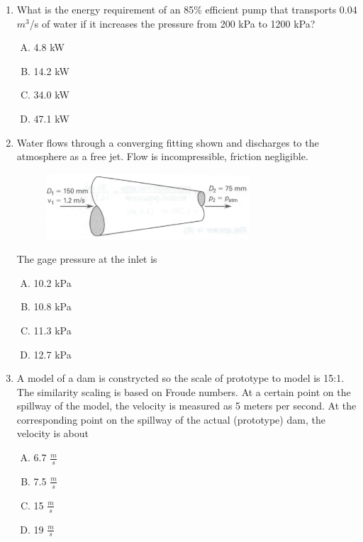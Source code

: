 \documentclass[12pt]{article}
\begin{document}
\begin{enumerate}
\item What is the energy requirement of an 85\% efficient pump that transports 0.04
$m^3$/s of water if it increases the pressure from 200 kPa to 1200 kPa?
\begin{enumerate}[A)]
\item 4.8 kW
\item 14.2 kW
\item 34.0 kW
\item 47.1 kW
\end{enumerate}

\item Water flows through a converging fitting shown and discharges to the atmosphere as a free jet.
Flow is incompressible, friction negligible.

\begin{figure}[htbp] %
   \centering
   \includegraphics[width=3in]{nozzle.png} 
   \caption{}
   \label{fig:nozzle}
\end{figure}

The gage pressure at the inlet is
\begin{enumerate}[A)]
\item 10.2 kPa
\item 10.8 kPa
\item 11.3 kPa
\item 12.7 kPa
\end{enumerate}

\item A model of a dam is constrycted so the scale of prototype to model is 15:1.  The similarity scaling is based on Froude numbers.  At a certain point on the spillway of the model, the velocity is measured as 5 meters per second. At the corresponding point on the spillway of the actual (prototype) dam, the velocity is about

\begin{enumerate}[A)]
\item 6.7 $\frac{m}{s}$
\item 7.5 $\frac{m}{s}$
\item 15 $\frac{m}{s}$
\item 19 $\frac{m}{s}$
\end{enumerate}


\end{enumerate}
\end{document}
